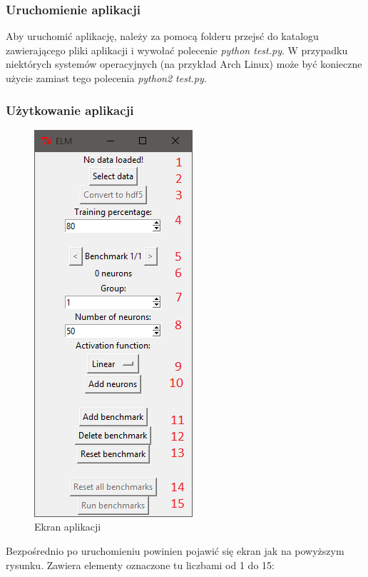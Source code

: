 \documentclass{article}
\begin{document}
\subsubsection*{Uruchomienie aplikacji}
Aby uruchomić aplikację, należy za pomocą folderu przejsć do katalogu zawierającego pliki aplikacji i wywołać polecenie \textit{python test.py}. W przypadku niektórych systemów operacyjnych (na przykład Arch Linux) może być konieczne użycie zamiast tego polecenia \textit{python2 test.py}.
\subsubsection*{Użytkowanie aplikacji}
\begin{figure}[H]
\centering
\includegraphics{instrukcja_python_start.png}
\caption{Ekran aplikacji}
\end{figure}
Bezpośrednio po uruchomieniu powinien pojawić się ekran jak na powyższym rysunku. Zawiera elementy oznaczone tu liczbami od 1 do 15:
\end{document}
